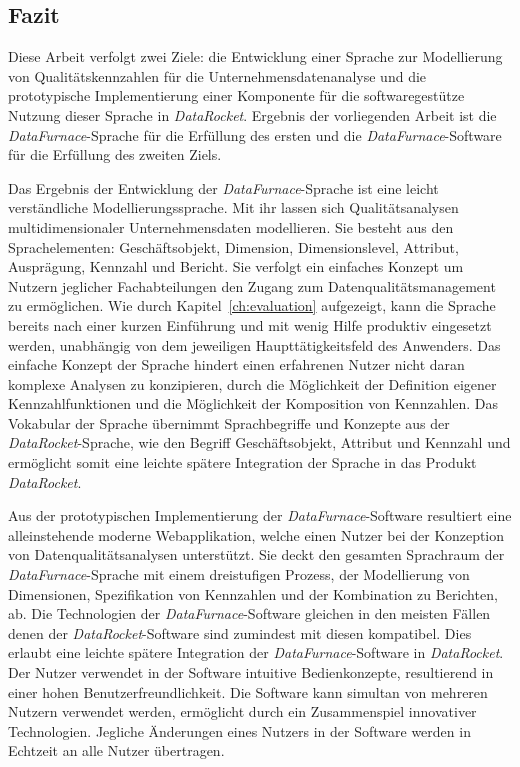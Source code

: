 \documentclass[
  language=german, %
  type=bachelor,%
  ngerman
]{isthesis}
\begin{document}
\begin{content}

\chapter{Fazit}\label{ch:fazit}

Diese Arbeit verfolgt zwei Ziele: die Entwicklung einer Sprache zur
Modellierung von Qualitätskennzahlen für die Unternehmensdatenanalyse und die
prototypische Implementierung einer Komponente für die softwaregestütze Nutzung
dieser Sprache in \textit{DataRocket}. Ergebnis der vorliegenden Arbeit ist die
\textit{DataFurnace}-Sprache für die Erfüllung des ersten und die
\textit{DataFurnace}-Software für die Erfüllung des zweiten Ziels.

Das Ergebnis der Entwicklung der \textit{DataFurnace}-Sprache ist eine leicht
verständliche Modellierungssprache. Mit ihr lassen sich Qualitätsanalysen
multidimensionaler Unternehmensdaten modellieren. Sie besteht aus den
Sprachelementen: Geschäftsobjekt, Dimension, Dimensionslevel, Attribut,
Ausprägung, Kennzahl und Bericht. Sie verfolgt ein
einfaches Konzept um Nutzern jeglicher Fachabteilungen den Zugang zum
Datenqualitätsmanagement zu ermöglichen. Wie durch Kapitel~\ref{ch:evaluation}
aufgezeigt, kann die Sprache bereits nach einer kurzen Einführung und mit wenig
Hilfe produktiv eingesetzt werden, unabhängig von dem jeweiligen
Haupttätigkeitsfeld des Anwenders. Das einfache Konzept der Sprache hindert einen
erfahrenen Nutzer nicht daran komplexe Analysen zu konzipieren, durch die
Möglichkeit der Definition eigener Kennzahlfunktionen und die Möglichkeit der
Komposition von Kennzahlen. Das Vokabular der Sprache übernimmt Sprachbegriffe
und Konzepte aus der \textit{DataRocket}-Sprache, wie \zB{} den Begriff
Geschäftsobjekt, Attribut und Kennzahl und ermöglicht somit eine leichte
spätere Integration der Sprache in das Produkt \textit{DataRocket}.

Aus der prototypischen Implementierung der \textit{DataFurnace}-Software
resultiert eine alleinstehende moderne Webapplikation, welche einen Nutzer bei
der Konzeption von Datenqualitätsanalysen unterstützt. Sie deckt den gesamten
Sprachraum der \textit{DataFurnace}-Sprache mit einem dreistufigen Prozess, der
Modellierung von Dimensionen, Spezifikation von Kennzahlen und der Kombination
zu Berichten, ab. Die Technologien der \textit{DataFurnace}-Software gleichen
in den meisten Fällen denen der \textit{DataRocket}-Software \bzw{} sind
zumindest mit diesen kompatibel. Dies erlaubt eine leichte spätere Integration
der \textit{DataFurnace}-Software in \textit{DataRocket}. Der Nutzer verwendet
in der Software intuitive Bedienkonzepte, resultierend in einer hohen
Benutzerfreundlichkeit. Die Software kann simultan von mehreren Nutzern
verwendet werden, ermöglicht durch ein Zusammenspiel innovativer Technologien.
Jegliche Änderungen eines Nutzers in der Software werden in Echtzeit an alle
Nutzer übertragen.


\end{content}
\end{document}
